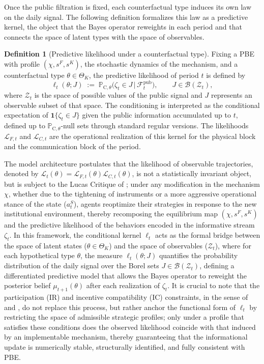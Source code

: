 \documentclass[review,authoryear,12pt]{elsarticle}
\theoremstyle{plain}
\theoremstyle{definition}
\newtheorem{definition}[theorem]{Definition}
\newcommand{\ProbC}[1]{\mathbb{P}_{\mathrm{C},#1}}
\newcommand{\ThetaK}{\Theta_K}
\newcommand{\1}{\mathbf{1}}
\begin{document}
Once the public filtration is fixed, each counterfactual type induces its own law on the daily signal. The following definition formalizes this law as a predictive kernel, the object that the Bayes operator reweights in each period and that connects the space of latent types with the space of observables.

\begin{definition}[Predictive likelihood under a counterfactual type]\label{def:predictive-likelihood}
Fixing a PBE with profile $(\chi,s^F,s^K)$, the stochastic dynamics of the mechanism, and a counterfactual type $\theta\in\ThetaK$, the predictive likelihood of period $t$ is defined by
\begin{equation}
\label{eq:likelihood-zeta}
\ell_t(\theta;J)\;:=\;\ProbC{\theta}\bigl(\zeta_t \in J \,\big|\, \mathcal{F}_t^{\mathrm{pub}}\bigr),
\qquad J\in\mathcal{B}(\mathcal{Z}_t),
\end{equation}
where $\mathcal{Z}_t$ is the space of possible values of the public signal and $J$ represents an observable subset of that space. The conditioning is interpreted as the conditional expectation of $\mathbf{1}\{\zeta_t\in J\}$ given the public information accumulated up to $t$, defined up to $\ProbC{\theta}$-null sets through standard regular versions. The likelihoods $\mathcal{L}_{F,t}$ and $\mathcal{L}_{C,t}$ are the operational realization of this kernel for the physical block and the communication block of the period.
\end{definition}

The model architecture postulates that the likelihood of observable trajectories, denoted by $\mathcal{L}_t(\theta)=\mathcal{L}_{F,t}(\theta)\mathcal{L}_{C,t}(\theta)$, is not a statistically invariant object, but is subject to the Lucas Critique of \citet{Lucas1976}; under any modification in the mechanism $\chi$, whether due to the tightening of instruments or a more aggressive operational stance of the state ($a_t^S$), agents reoptimize their strategies in response to the new institutional environment, thereby recomposing the equilibrium map $(\chi, s^F, s^K)$ and the predictive likelihood of the behaviors encoded in the informative stream $\zeta_t$. In this framework, the conditional kernel $\ell_t$ acts as the formal bridge between the space of latent states ($\theta \in \ThetaK$) and the space of observables ($\mathcal{Z}_t$), where for each hypothetical type $\theta$, the measure $\ell_t(\theta; J)$ quantifies the probability distribution of the daily signal over the Borel sets $J \in \mathcal{B}(\mathcal{Z}_t)$, defining a differentiated predictive model that allows the Bayes operator to reweight the posterior belief $\mu_{t+1}(\theta)$ after each realization of $\zeta_t$. It is crucial to note that the participation (IR) and incentive compatibility (IC) constraints, in the sense of \citet{Myerson1979IC} and \citet{BoltonDewatripont2005}, do not replace this process, but rather anchor the functional form of $\ell_t$ by restricting the space of admissible strategic profiles; only under a profile that satisfies these conditions does the observed likelihood coincide with that induced by an implementable mechanism, thereby guaranteeing that the informational update is numerically stable, structurally identified, and fully consistent with PBE.
\end{document}
